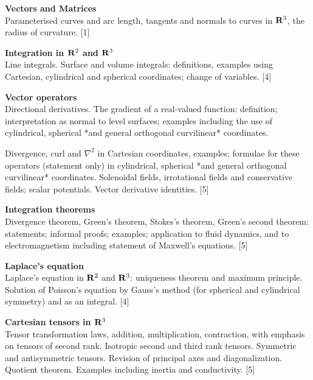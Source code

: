 \documentclass{article}
\begin{document}
\maketitle
{\small
  \noindent\textbf{Vectors and Matrices}\\
  Parameterised curves and arc length, tangents and normals to curves in $\mathbf{R}^3$, the radius of curvature.\hspace*{\fill} [1]

  \vspace{10pt}
  \noindent\textbf{Integration in $\mathbf{R}^2$ and $\mathbf{R}^3$}\\
  Line integrals. Surface and volume integrals: definitions, examples using Cartesian, cylindrical and spherical coordinates; change of variables.\hspace*{\fill} [4]

  \vspace{10pt}
  \noindent\textbf{Vector operators}\\
  Directional derivatives. The gradient of a real-valued function: definition; interpretation as normal to level surfaces; examples including the use of cylindrical, spherical *and general orthogonal curvilinear* coordinates.

  \vspace{5pt}
  \noindent Divergence, curl and $\nabla^2$ in Cartesian coordinates, examples; formulae for these operators (statement only) in cylindrical, spherical *and general orthogonal curvilinear* coordinates. Solenoidal fields, irrotational fields and conservative fields; scalar potentials. Vector derivative identities.\hspace*{\fill} [5]

  \vspace{10pt}
  \noindent\textbf{Integration theorems}\\
  Divergence theorem, Green's theorem, Stokes's theorem, Green's second theorem: statements; informal proofs; examples; application to fluid dynamics, and to electromagnetism including statement of Maxwell's equations.\hspace*{\fill} [5]

  \vspace{10pt}
  \noindent\textbf{Laplace's equation}\\
  Laplace's equation in $\mathbf{R}^2$ and $\mathbf{R}^3$: uniqueness theorem and maximum principle. Solution of Poisson's equation by Gauss's method (for spherical and cylindrical symmetry) and as an integral.\hspace*{\fill} [4]

  \vspace{10pt}
  \noindent\textbf{Cartesian tensors in $\mathbf{R}^3$}\\
  Tensor transformation laws, addition, multiplication, contraction, with emphasis on tensors of second rank. Isotropic second and third rank tensors. Symmetric and antisymmetric tensors. Revision of principal axes and diagonalization. Quotient theorem. Examples including inertia and conductivity.\hspace*{\fill} [5]}
\end{document}
